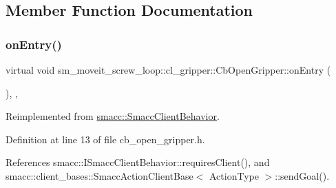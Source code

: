 \subsection{Member Function Documentation}
\mbox{\label{classsm__moveit__screw__loop_1_1cl__gripper_1_1CbOpenGripper_af662bd9f6e0d190bcfc7f8d2168cee79}} 
\subsubsection{\texorpdfstring{on\+Entry()}{onEntry()}}
{\footnotesize\ttfamily virtual void sm\+\_\+moveit\+\_\+screw\+\_\+loop\+::cl\+\_\+gripper\+::\+Cb\+Open\+Gripper\+::on\+Entry (\begin{DoxyParamCaption}{ }\end{DoxyParamCaption})\hspace{0.3cm}{\ttfamily [inline]}, {\ttfamily [override]}, {\ttfamily [virtual]}}



Reimplemented from \hyperlink{classsmacc_1_1SmaccClientBehavior_ad5d3e1f1697c3cfe66c94cadba948493}{smacc\+::\+Smacc\+Client\+Behavior}.



Definition at line 13 of file cb\+\_\+open\+\_\+gripper.\+h.



References smacc\+::\+I\+Smacc\+Client\+Behavior\+::requires\+Client(), and smacc\+::client\+\_\+bases\+::\+Smacc\+Action\+Client\+Base$<$ Action\+Type $>$\+::send\+Goal().


